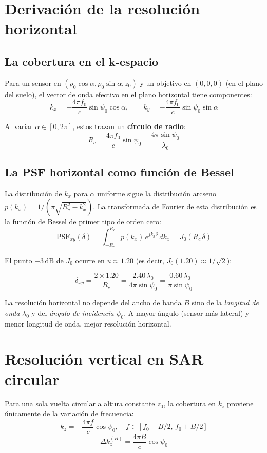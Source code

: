 \documentclass[12pt,a4paper,oneside]{book}
\newcommand{\result}[2]{%
  \begin{tcolorbox}[enhanced, breakable,
    colback=yellow!8, colframe=orange!70!black,
    fonttitle=\bfseries,
    title={\protect#1},
    attach boxed title to top left={yshift=-2mm, xshift=5mm},
    boxed title style={colback=orange!70!black}]
    #2
  \end{tcolorbox}}
\newcommand{\nota}[2]{%
  \begin{tcolorbox}[enhanced, breakable,
    colback=green!5, colframe=green!50!black,
    fonttitle=\bfseries\small,
    title={\protect#1}]
    #2
  \end{tcolorbox}}
\begin{document}
\section{Derivación de la resolución horizontal}

\subsection{La cobertura en el k-espacio}

Para un sensor en $(\rho_0\cos\alpha, \rho_0\sin\alpha, z_0)$ y un objetivo en $(0,0,0)$ (en el plano del suelo), el vector de onda efectivo en el plano horizontal tiene componentes:
\[
k_x = -\frac{4\pi f_0}{c}\sin\psi_0\cos\alpha, \qquad k_y = -\frac{4\pi f_0}{c}\sin\psi_0\sin\alpha
\]

Al variar $\alpha \in [0, 2\pi]$, estos trazan un \textbf{círculo de radio}:
\[
R_c = \frac{4\pi f_0}{c}\sin\psi_0 = \frac{4\pi\sin\psi_0}{\lambda_0}
\]

\subsection{La PSF horizontal como función de Bessel}

La distribución de $k_x$ para $\alpha$ uniforme sigue la distribución arcseno $p(k_x) = 1/(\pi\sqrt{R_c^2-k_x^2})$. La transformada de Fourier de esta distribución es la función de Bessel de primer tipo de orden cero:
\[
\text{PSF}_{xy}(\delta) = \int_{-R_c}^{R_c} p(k_x)\,e^{jk_x\delta}\,dk_x = J_0(R_c\,\delta)
\]

El punto $-3\,\text{dB}$ de $J_0$ ocurre en $u \approx 1.20$ (es decir, $J_0(1.20) \approx 1/\sqrt{2}$):

\result{Resolución Horizontal, SAR Circular Monoestático}{
\[
\boxed{\delta_{xy} = \frac{2\times 1.20}{R_c} = \frac{2.40\,\lambda_0}{4\pi\sin\psi_0} = \frac{0.60\,\lambda_0}{\pi\sin\psi_0}}
\]
}

\nota{Interpretación física}{
La resolución horizontal no depende del ancho de banda $B$ sino de la \emph{longitud de onda} $\lambda_0$ y del \emph{ángulo de incidencia} $\psi_0$. A mayor ángulo (sensor más lateral) y menor longitud de onda, mejor resolución horizontal.
}

\section{Resolución vertical en SAR circular}

Para una sola vuelta circular a altura constante $z_0$, la cobertura en $k_z$ proviene únicamente de la variación de frecuencia:
\[
k_z = -\frac{4\pi f}{c}\cos\psi_0, \quad f \in [f_0-B/2,\, f_0+B/2]
\]
\[
\Delta k_z^{(B)} = \frac{4\pi B}{c}\cos\psi_0
\]
\end{document}
